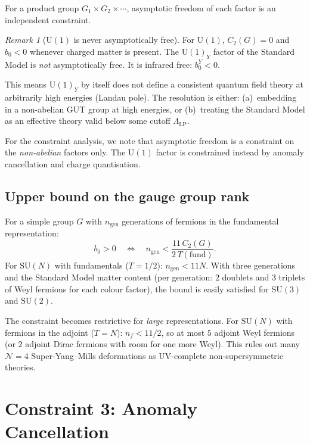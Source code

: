 \documentclass[12pt]{article}
\theoremstyle{definition}
\theoremstyle{remark}
\newtheorem{remark}[theorem]{Remark}
\newcommand{\SU}{\mathrm{SU}}
\newcommand{\UU}{\mathrm{U}}
\begin{document}
For a product group $G_1 \times G_2 \times \cdots$, asymptotic
freedom of each factor is an independent constraint.

\begin{remark}[$\UU(1)$ is never asymptotically free]
\label{rem:U1}
For $\UU(1)$, $C_2(G) = 0$ and $b_0 < 0$ whenever
charged matter is present.  The $\UU(1)_Y$ factor of the
Standard Model is \emph{not} asymptotically free.  It is
infrared free: $b_0^{Y} < 0$.

This means $\UU(1)_Y$ by itself does not define a
consistent quantum field theory at arbitrarily high energies
(Landau pole).  The resolution is either:
(a)~embedding in a non-abelian GUT group at high energies, or
(b)~treating the Standard Model as an effective theory valid
below some cutoff $\Lambda_{\mathrm{LP}}$.

For the constraint analysis, we note that asymptotic freedom
is a constraint on the \emph{non-abelian} factors only.
The $\UU(1)$ factor is constrained instead by anomaly
cancellation and charge quantisation.
\end{remark}

\subsection{Upper bound on the gauge group rank}

For a simple group $G$ with $n_{\mathrm{gen}}$ generations of
fermions in the fundamental representation:
\[
  b_0 > 0
  \quad\Longleftrightarrow\quad
  n_{\mathrm{gen}} < \frac{11\,C_2(G)}{2\,T(\text{fund})}.
\]
For $\SU(N)$ with fundamentals ($T = 1/2$):
$n_{\mathrm{gen}} < 11N$.  With three generations and the
Standard Model matter content (per generation: $2$ doublets and
$3$ triplets of Weyl fermions for each colour factor),
the bound is easily satisfied for $\SU(3)$ and $\SU(2)$.

The constraint becomes restrictive for \emph{large}
representations.  For $\SU(N)$ with fermions in the adjoint
($T = N$): $n_f < 11/2$, so at most $5$ adjoint Weyl fermions
(or $2$ adjoint Dirac fermions with room for one more Weyl).
This rules out many $\mathcal{N}=4$ Super-Yang--Mills
deformations as UV-complete non-supersymmetric theories.

\section{Constraint 3: Anomaly Cancellation}
\label{sec:anomaly}
\end{document}
